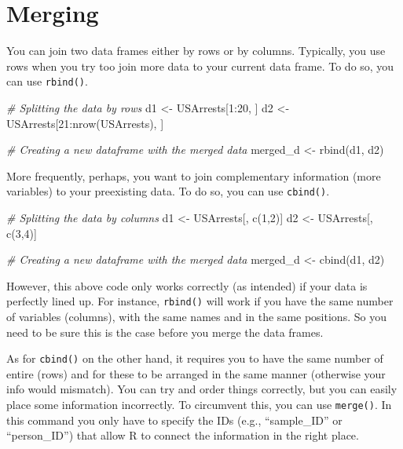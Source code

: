 \documentclass[
]{book}
\newenvironment{Shaded}{\begin{snugshade}}{\end{snugshade}}
\newcommand{\CommentTok}[1]{\textcolor[rgb]{0.56,0.35,0.01}{\textit{#1}}}
\newcommand{\DecValTok}[1]{\textcolor[rgb]{0.00,0.00,0.81}{#1}}
\newcommand{\FunctionTok}[1]{\textcolor[rgb]{0.00,0.00,0.00}{#1}}
\newcommand{\NormalTok}[1]{#1}
\newcommand{\OtherTok}[1]{\textcolor[rgb]{0.56,0.35,0.01}{#1}}
\newcommand{\SpecialCharTok}[1]{\textcolor[rgb]{0.00,0.00,0.00}{#1}}
\begin{document}
\hypertarget{merging}{%
\section{Merging}\label{merging}}

You can join two data frames either by rows or by columns.
Typically, you use rows when you try too join more data to your current data frame.
To do so, you can use \texttt{rbind()}.

\begin{Shaded}
\begin{Highlighting}[]
\CommentTok{\# Splitting the data by rows}
\NormalTok{d1 }\OtherTok{\textless{}{-}}\NormalTok{ USArrests[}\DecValTok{1}\SpecialCharTok{:}\DecValTok{20}\NormalTok{, ]}
\NormalTok{d2 }\OtherTok{\textless{}{-}}\NormalTok{ USArrests[}\DecValTok{21}\SpecialCharTok{:}\FunctionTok{nrow}\NormalTok{(USArrests), ]}

\CommentTok{\# Creating a new dataframe with the merged data}
\NormalTok{merged\_d }\OtherTok{\textless{}{-}} \FunctionTok{rbind}\NormalTok{(d1, d2)}
\end{Highlighting}
\end{Shaded}

More frequently, perhaps, you want to join complementary information (more variables) to your preexisting data.
To do so, you can use \texttt{cbind()}.

\begin{Shaded}
\begin{Highlighting}[]
\CommentTok{\# Splitting the data by columns}
\NormalTok{d1 }\OtherTok{\textless{}{-}}\NormalTok{ USArrests[, }\FunctionTok{c}\NormalTok{(}\DecValTok{1}\NormalTok{,}\DecValTok{2}\NormalTok{)]}
\NormalTok{d2 }\OtherTok{\textless{}{-}}\NormalTok{ USArrests[, }\FunctionTok{c}\NormalTok{(}\DecValTok{3}\NormalTok{,}\DecValTok{4}\NormalTok{)]}

\CommentTok{\# Creating a new dataframe with the merged data}
\NormalTok{merged\_d }\OtherTok{\textless{}{-}} \FunctionTok{cbind}\NormalTok{(d1, d2)}
\end{Highlighting}
\end{Shaded}

However, this above code only works correctly (as intended) if your data is perfectly lined up.
For instance, \texttt{rbind()} will work if you have the same number of variables (columns), with the same names and in the same positions.
So you need to be sure this is the case before you merge the data frames.

As for \texttt{cbind()} on the other hand, it requires you to have the same number of entire (rows) and for these to be arranged in the same manner (otherwise your info would mismatch).
You can try and order things correctly, but you can easily place some information incorrectly.
To circumvent this, you can use \texttt{merge()}.
In this command you only have to specify the IDs (e.g., ``sample\_ID'' or ``person\_ID'') that allow R to connect the information in the right place.
\end{document}
